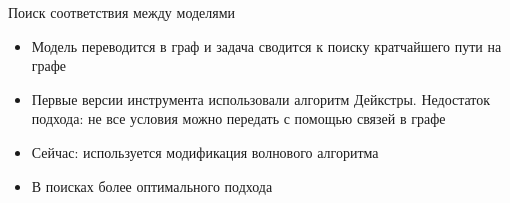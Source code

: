 \documentclass[12pt]{beamer}
\begin{document}
{
\begin{frame}{Поиск соответствия между моделями}
  \begin{mybox}[]
  \begin{itemize}
  	\item Модель переводится в граф и задача сводится к поиску кратчайшего пути на графе
  	\item Первые версии инструмента использовали алгоритм Дейкстры. Недостаток подхода: не все условия можно передать с помощью связей в графе
  	\item Сейчас: используется модификация волнового алгоритма
  	\item В поисках более оптимального подхода
  \end{itemize}
  \end{mybox}
\end{frame}
}
\end{document}
